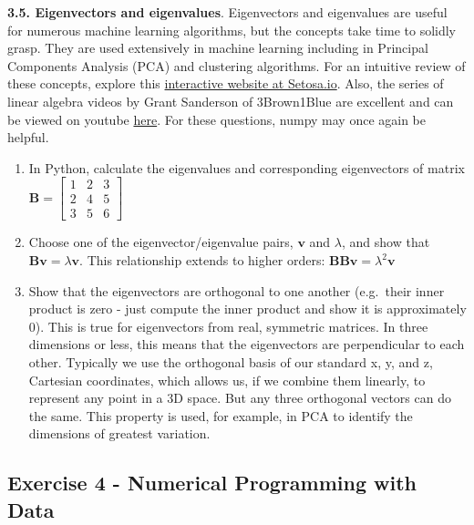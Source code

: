 \documentclass[
  letterpaper,
  DIV=11,
  numbers=noendperiod]{scrartcl}
\providecommand{\tightlist}{%
  \setlength{\itemsep}{0pt}\setlength{\parskip}{0pt}}\usepackage{longtable,booktabs,array}
\begin{document}
\textbf{3.5. Eigenvectors and eigenvalues}. Eigenvectors and eigenvalues
are useful for numerous machine learning algorithms, but the concepts
take time to solidly grasp. They are used extensively in machine
learning including in Principal Components Analysis (PCA) and clustering
algorithms. For an intuitive review of these concepts, explore this
\href{http://setosa.io/ev/eigenvectors-and-eigenvalues/}{interactive
website at Setosa.io}. Also, the series of linear algebra videos by
Grant Sanderson of 3Brown1Blue are excellent and can be viewed on
youtube
\href{https://www.youtube.com/playlist?list=PLZHQObOWTQDPD3MizzM2xVFitgF8hE_ab}{here}.
For these questions, numpy may once again be helpful.

\begin{enumerate}
\def\labelenumi{\arabic{enumi}.}
\tightlist
\item
  In Python, calculate the eigenvalues and corresponding eigenvectors of
  matrix \(\mathbf{B}=  \begin{bmatrix}
  1 & 2 & 3 \\
  2 & 4 & 5 \\
  3 & 5 & 6
  \end{bmatrix}\)
\item
  Choose one of the eigenvector/eigenvalue pairs, \(\mathbf{v}\) and
  \(\lambda\), and show that
  \(\mathbf{B} \mathbf{v} = \lambda \mathbf{v}\). This relationship
  extends to higher orders:
  \(\mathbf{B} \mathbf{B} \mathbf{v} = \lambda^2 \mathbf{v}\)
\item
  Show that the eigenvectors are orthogonal to one another (e.g.~their
  inner product is zero - just compute the inner product and show it is
  approximately 0). This is true for eigenvectors from real, symmetric
  matrices. In three dimensions or less, this means that the
  eigenvectors are perpendicular to each other. Typically we use the
  orthogonal basis of our standard x, y, and z, Cartesian coordinates,
  which allows us, if we combine them linearly, to represent any point
  in a 3D space. But any three orthogonal vectors can do the same. This
  property is used, for example, in PCA to identify the dimensions of
  greatest variation.
\end{enumerate}

\newpage{}

\subsection{Exercise 4 - Numerical Programming with
Data}\label{exercise-4---numerical-programming-with-data}
\end{document}
